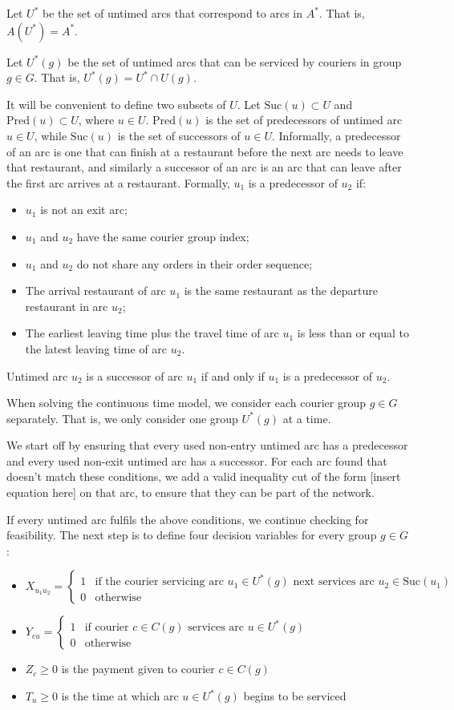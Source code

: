 \documentclass{article}
\newcommand{\Pred}{\text{Pred}}
\newcommand{\Suc}{\text{Suc}}
\begin{document}
Let $U^*$ be the set of untimed arcs that correspond to arcs in $A^*$. That is, $A(U^*)=A^*$.

Let $U^*(g)$ be the set of untimed arcs that can be serviced by couriers in group $g\in G$. That is, $U^*(g)=U^*\cap U(g)$.

It will be convenient to define two subsets of $U$. Let $\Suc(u)\subset U$ and $\Pred(u)\subset U$, where $u\in U$. $\Pred(u)$ is the set of predecessors of untimed arc $u\in U$, while $\Suc(u)$ is the set of successors of $u\in U$. Informally, a predecessor of an arc is one that can finish at a restaurant before the next arc needs to leave that restaurant, and similarly a successor of an arc is an arc that can leave after the first arc arrives at a restaurant. Formally, $u_1$ is a predecessor of $u_2$ if:
\begin{itemize}
\item $u_1$ is not an exit arc;
\item $u_1$ and $u_2$ have the same courier group index;
\item $u_1$ and $u_2$ do not share any orders in their order sequence;
\item The arrival restaurant of arc $u_1$ is the same restaurant as the departure restaurant in arc $u_2$;
\item The earliest leaving time plus the travel time of arc $u_1$ is less than or equal to the latest leaving time of arc $u_2$.
\end{itemize}

Untimed arc $u_2$ is a successor of arc $u_1$ if and only if $u_1$ is a predecessor of $u_2$.

When solving the continuous time model, we consider each courier group $g\in G$ separately. That is, we only consider one group $U^*(g)$ at a time.

We start off by ensuring that every used non-entry untimed arc has a predecessor and every used non-exit untimed arc has a successor. For each arc found that doesn't match these conditions, we add a valid inequality cut of the form [insert equation here] on that arc, to ensure that they can be part of the network.

If every untimed arc fulfils the above conditions, we continue checking for feasibility. The next step is to define four decision variables for every group $g\in G$:
\begin{itemize}
\item $X_{u_1u_2}=\begin{cases}1&\text{if the courier servicing arc $u_1\in U^*(g)$ next services arc $u_2\in\Suc(u_1)$}\\0&\text{otherwise}\end{cases}$
\item $Y_{cu}=\begin{cases}1&\text{if courier $c\in C(g)$ services arc $u\in U^*(g)$}\\0&\text{otherwise}\end{cases}$
\item $Z_c\geq0$ is the payment given to courier $c\in C(g)$
\item $T_u\geq0$ is the time at which arc $u\in U^*(g)$ begins to be serviced
\end{itemize}
\end{document}
